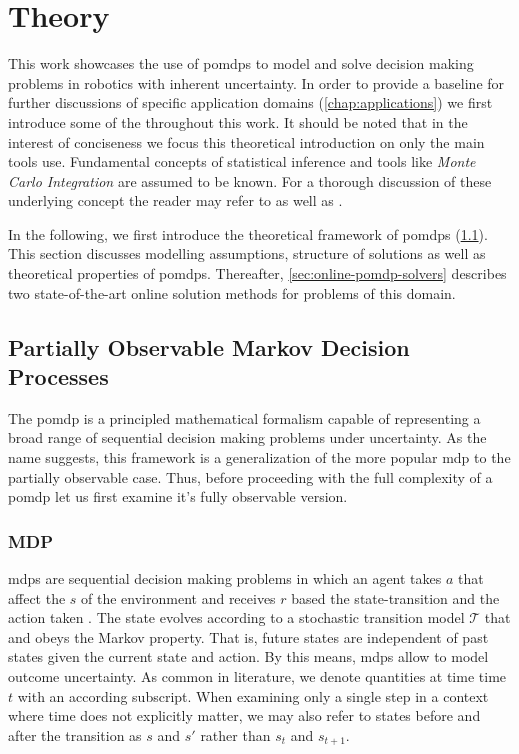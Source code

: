 \chapter{Theory}

This work showcases the use of \glspl{pomdp} to model and solve decision making
problems in robotics with inherent uncertainty. In order to provide a baseline
for further discussions of specific application domains
(\cref{chap:applications}) we first introduce some of the throughout this work.
It should be noted that in the interest of conciseness we focus this
theoretical introduction on only the main tools use. Fundamental concepts of
statistical inference and tools like \textit{Monte Carlo Integration} are
assumed to be known. For a thorough discussion of these underlying concept the
reader may refer to \cite{kochenderfer2015decision} as well as
\cite{probRobotics}.

In the following, we first introduce the theoretical framework of \glspl{pomdp}
(\cref{sec:pomdp}). This section discusses modelling assumptions, structure
of solutions as well as theoretical properties of \glspl{pomdp}. Thereafter,
\cref{sec:online-pomdp-solvers} describes two state-of-the-art online solution
methods for problems of this domain.

\section{Partially Observable Markov Decision Processes}\label{sec:pomdp}

The \acf{pomdp} is a principled mathematical formalism capable of representing
a broad range of sequential decision making problems under uncertainty. As the
name suggests, this framework is a generalization of the more popular \ac{mdp}
to the partially observable case. Thus, before proceeding with the full
complexity of a \ac{pomdp} let us first examine it's fully observable version.

\subsection{MDP}

\glspl{mdp} are sequential decision making problems in which an agent takes
 $a$ that affect the  $s$ of the environment and
receives  $r$ based the state-transition and the action taken
\cite{kochenderfer2015decision}.  The state evolves
according to a stochastic transition model $\mathcal{T}$ that and obeys the
Markov property. That is, future states are independent of past states given
the current state and action. By this means, \glspl{mdp} allow to model outcome
uncertainty. As common in literature, we denote quantities at time time $t$
with an according subscript. When examining only a single step in a context
where time does not explicitly matter, we may also refer to states before
and after the transition as $s$ and $s'$ rather than $s_t$ and $s_{t+1}$.

